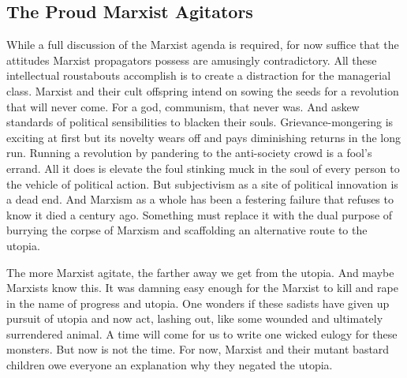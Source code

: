 \documentclass[12pt]{article}
\begin{document}
\subsection{The Proud Marxist Agitators}
While a full discussion of the Marxist agenda is required, for now suffice that the attitudes Marxist propagators possess are amusingly contradictory.
All these intellectual roustabouts accomplish is to create a distraction for the managerial class.
Marxist and their cult offspring intend on sowing the seeds for a revolution that will never come.
For a god, communism, that never was.
And askew standards of political sensibilities to blacken their souls.
Grievance-mongering is exciting at first but its novelty wears off and pays diminishing returns in the long run.
Running a revolution by pandering to the anti-society crowd is a fool's errand.
All it does is elevate the foul stinking muck in the soul of every person to the vehicle of political action.
But subjectivism as a site of political innovation is a dead end.
And Marxism as a whole has been a festering failure that refuses to know it died a century ago.
Something must replace it with the dual purpose of burrying the corpse of Marxism and scaffolding an alternative route to the utopia.

The more Marxist agitate, the farther away we get from the utopia.
And maybe Marxists know this.
It was damning easy enough for the Marxist to kill and rape in the name of progress and utopia.
One wonders if these sadists have given up pursuit of utopia and now act, lashing out, like some wounded and ultimately surrendered animal.
A time will come for us to write one wicked eulogy for these monsters.
But now is not the time.
For now, Marxist and their mutant bastard children owe everyone an explanation why they negated the utopia.
\end{document}

